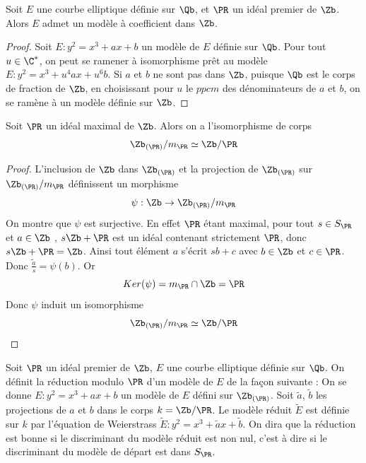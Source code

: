 \begin{Prop}
	Soit $E$ une courbe elliptique définie sur $\Qb$, et $\PR$ un idéal premier de $\Zb$. Alors $E$ admet un modèle à coefficient dans $\Zb$. 
\end{Prop}

\begin{proof}
	Soit $E : y^2 = x^3 + ax + b$ un modèle de $E$ définie sur $\Qb$. Pour tout $u\in\C^{*}$, on peut se ramener à isomorphisme prêt au modèle 
	$E : y^2 = x^3 + u^4ax + u^6b$. Si $a$ et $b$ ne sont pas dans $\Zb$, puisque $\Qb$ est le corps de fraction de $\Zb$, en choisissant pour $u$ le $ppcm$ des dénominateurs de $a$ et $b$, on se ramène à un modèle définie sur $\Zb$. 
\end{proof}

\begin{Prop}
	Soit $\PR$ un idéal maximal de $\Zb$. Alors on a l'isomorphisme de corps
	\begin{equation*}
		\Zb_{\left( \PR\right) } / m_{\PR} \simeq \Zb/\PR 
	\end{equation*}
\end{Prop}

\begin{proof}
	L'inclusion de $\Zb$ dans $\Zb_{\left( \PR\right) }$ et la projection de $\Zb_{\left( \PR\right) }$ sur $\Zb_{\left( \PR\right) } / m_{\PR}$ définissent un morphisme 
	\begin{equation*}
		\psi : \Zb \rightarrow \Zb_{\left( \PR\right) } / m_{\PR}
	\end{equation*}
	On montre que $\psi$ est surjective. En effet $\PR$ étant maximal, pour tout $s\in S_{\PR}$ et $a\in\Zb$ , $s\Zb + \PR$ est un idéal contenant strictement $\PR$, donc $s\Zb + \PR = \Zb$. Ainsi tout élément $a$ s'écrit $sb + c$ avec $b\in\Zb$ et $c\in\PR$. Donc $\tilde{\frac{a}{s}} = \psi(b)$. Or 
	\begin{equation*}
		Ker (\psi) = m_{\PR}\cap\Zb = \PR
	\end{equation*}
	Donc $\psi$ induit un isomorphisme 
	\begin{equation*}
		\Zb_{\left( \PR\right) } / m_{\PR} \simeq \Zb/\PR 
	\end{equation*}
\end{proof}

\begin{Def}
	Soit $\PR$ un idéal premier de $\Zb$, $E$ une courbe elliptique définie sur $\Qb$. On définit la réduction modulo $\PR$ d'un modèle de $E$ de la façon suivante : On se donne $E : y^2 = x^3 + ax + b$ un modèle de $E$ défini sur $\Zb_{\left( \PR\right) }$. Soit $\tilde{a}$, $\tilde{b}$ les projections de $a$ et $b$ dans le corps $k = \Zb / \PR$. Le modèle réduit $\tilde{E}$ est définie sur $k$ par l'équation de Weierstrass $\tilde{E} : y^2 = x^3 + \tilde{a}x + \tilde{b}$. On dira que la réduction est bonne si le discriminant du modèle réduit est non nul, c'est à dire si le discriminant du modèle de départ est dans $S_{\PR}$.
\end{Def}


